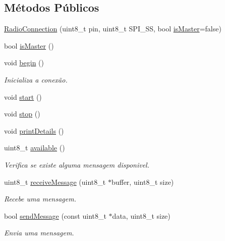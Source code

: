 \subsection*{Métodos Públicos}
\begin{DoxyCompactItemize}
\item 
\hyperlink{classRadioConnection_ab901c79237a74d39f756b497140c9256}{Radio\-Connection} (uint8\-\_\-t pin, uint8\-\_\-t S\-P\-I\-\_\-\-S\-S, bool \hyperlink{classRadioConnection_a1e47d7b5f29f786ff2c90bf7446ac145}{is\-Master}=false)
\item 
bool \hyperlink{classRadioConnection_a1e47d7b5f29f786ff2c90bf7446ac145}{is\-Master} ()
\item 
void \hyperlink{classRadioConnection_a1deb37d098b17cfdf2c5c90e67a279aa}{begin} ()
\begin{DoxyCompactList}\small\item\em Inicializa a conexão. \end{DoxyCompactList}\item 
void \hyperlink{classRadioConnection_a50c54a480bbb37df2ecefb82aa9aa2a9}{start} ()
\item 
void \hyperlink{classRadioConnection_aa351758992987f76f2f14700c35daf04}{stop} ()
\item 
void \hyperlink{classRadioConnection_a170cffba8c7b427948429b41e6014ea3}{print\-Details} ()
\item 
uint8\-\_\-t \hyperlink{classRadioConnection_a970ffcf382ae789c22023857c5c48d83}{available} ()
\begin{DoxyCompactList}\small\item\em Verifica se existe alguma mensagem disponivel. \end{DoxyCompactList}\item 
uint8\-\_\-t \hyperlink{classRadioConnection_a6dc7c7b2a7c9b5d754d73f80516a37fc}{receive\-Message} (uint8\-\_\-t $\ast$buffer, uint8\-\_\-t size)
\begin{DoxyCompactList}\small\item\em Recebe uma mensagem. \end{DoxyCompactList}\item 
bool \hyperlink{classRadioConnection_a1bc09119403b84463264710ea40f5a4c}{send\-Message} (const uint8\-\_\-t $\ast$data, uint8\-\_\-t size)
\begin{DoxyCompactList}\small\item\em Envia uma mensagem. \end{DoxyCompactList}\end{DoxyCompactItemize}


